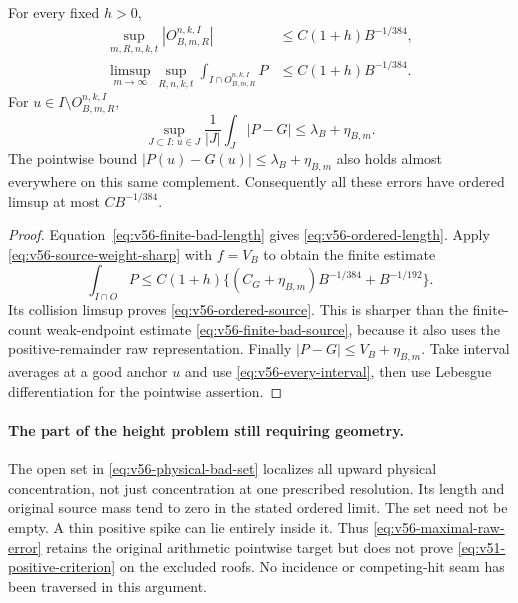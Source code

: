 \begin{corollary}
\label{cor:v56-ordered-localization}
For every fixed $h>0$,
\begin{align}
 \sup_{m,R,n,k,t}|O_{B,m,R}^{n,k,I}|
       &\le C(1+h)B^{-1/384},
                                      \label{eq:v56-ordered-length}\\
 \limsup_{m\to\infty}\sup_{R,n,k,t}
       \int_{I\cap O_{B,m,R}^{n,k,I}}P
       &\le C(1+h)B^{-1/384}.          \label{eq:v56-ordered-source}
\end{align}
For $u\in I\setminus O_{B,m,R}^{n,k,I}$,
\begin{equation}\label{eq:v56-maximal-raw-error}
 \sup_{J\subset I:\,u\in J}\frac1{|J|}\int_J|P-G|
                         \le\lambda_B+\eta_{B,m}.
\end{equation}
The pointwise bound $|P(u)-G(u)|\le\lambda_B+\eta_{B,m}$ also
holds almost everywhere on this same complement. Consequently all
these errors have ordered limsup at most $CB^{-1/384}$.
\end{corollary}
\begin{proof}
Equation~\eqref{eq:v56-finite-bad-length} gives
\eqref{eq:v56-ordered-length}. Apply
\eqref{eq:v56-source-weight-sharp} with $f=V_B$ to obtain the
finite estimate
\[
 \int_{I\cap O}P\le
 C(1+h)\{(C_G+\eta_{B,m})B^{-1/384}+B^{-1/192}\}.
\]
Its collision limsup proves \eqref{eq:v56-ordered-source}.
This is sharper than the finite-count weak-endpoint estimate
\eqref{eq:v56-finite-bad-source}, because it also uses the
positive-remainder raw representation. Finally
$|P-G|\le V_B+\eta_{B,m}$. Take interval averages at a good
anchor $u$ and use \eqref{eq:v56-every-interval}, then use
Lebesgue differentiation for the pointwise assertion.
\end{proof}

\paragraph{The part of the height problem still requiring geometry.}
The open set in \eqref{eq:v56-physical-bad-set} localizes all upward
physical concentration, not just concentration at one prescribed
resolution. Its length and original source mass tend to zero in the
stated ordered limit. The set need not be empty. A thin positive spike
can lie entirely inside it. Thus \eqref{eq:v56-maximal-raw-error}
retains the original arithmetic pointwise target but does not prove
\eqref{eq:v51-positive-criterion} on the excluded roofs. No incidence
or competing-hit seam has been traversed in this argument.
